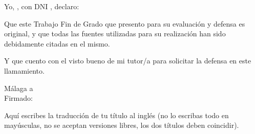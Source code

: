 \documentclass[13pt,a4paper]{report}
\begin{document}

\vspace{12pt}

Yo, \makebox[2cm]{\dotfill}, con DNI  \makebox[2cm]{\dotfill}, declaro:  %

\vspace{12pt}

Que este Trabajo Fin de Grado que presento para su evaluación y defensa es original, y que todas las fuentes utilizadas para su realización han sido debidamente citadas en el mismo. 

\vspace{12pt}

Y que cuento con el visto bueno de mi tutor/a para solicitar la defensa en este llamamiento.
\begin{flushright}
    Málaga a  \makebox[2cm]{\dotfill} \\ %
    \vspace{5cm}
     Firmado: \makebox[5cm]{\dotfill} %
\end{flushright}



\newpage
{} %

\renewcommand{\contentsname}{ÍNDICE} 
\clearpage
\pagestyle{fancy}%
\tableofcontents

\newpage 
{} %

\vspace{12pt}

Aquí escribes la traducción de tu título al inglés (no lo escribas todo en mayúsculas, no se aceptan versiones libres, los dos títulos deben coincidir).

\vspace{12pt}


\vspace{12pt}
\end{document}

